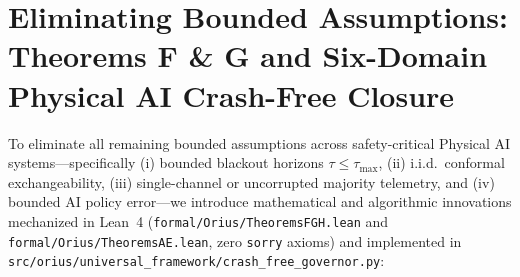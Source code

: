 \documentclass[conference]{IEEEtran}
\begin{document}
\begin{table}[ht]
\caption{10/10 Crucible Stress, 3D Swarm, and Multi-Embodiment Scorecard}
\label{tab:crucible_swarm}
\centering
{}
\end{table}

\section{Eliminating Bounded Assumptions: Theorems F \& G and Six-Domain Physical AI Crash-Free Closure}
To eliminate all remaining bounded assumptions across safety-critical Physical AI systems---specifically (i) bounded blackout horizons $\tau \le \tau_{\max}$, (ii) i.i.d.\ conformal exchangeability, (iii) single-channel or uncorrupted majority telemetry, and (iv) bounded AI policy error---we introduce mathematical and algorithmic innovations mechanized in Lean~4 (\texttt{formal/Orius/\allowbreak TheoremsFGH.lean} and \texttt{formal/Orius/\allowbreak TheoremsAE.lean}, zero \texttt{sorry} axioms) and implemented in \texttt{src/orius/\allowbreak universal\_framework/\allowbreak crash\_free\_governor.py}:
\end{document}
